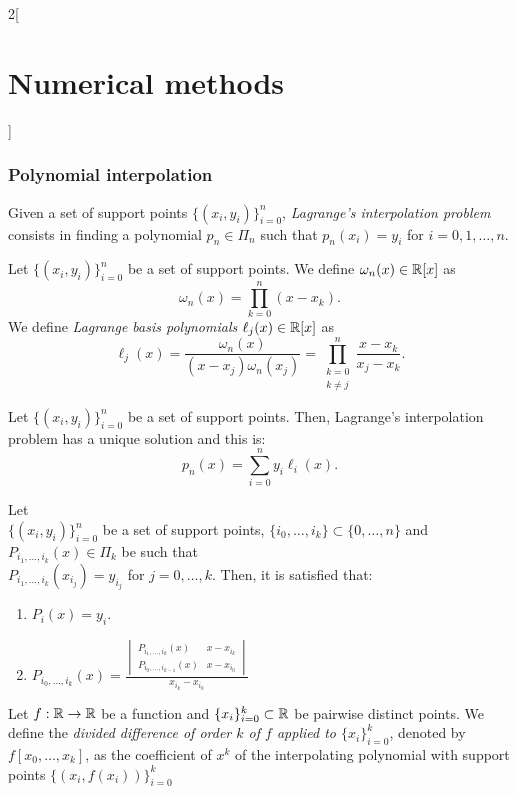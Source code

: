 \documentclass[../../../main.tex]{subfiles}
\begin{document}
\begin{multicols}{2}[\section{Numerical methods}]
\subsubsection*{Polynomial interpolation}
\begin{definition}
    Given a set of support points $\{(x_i,y_i)\}_{i=0}^n$, \textit{Lagrange's interpolation problem} consists in finding a polynomial $p_n\in\Pi_n$ such that $p_n(x_i)=y_i$ for $i=0,1,\ldots,n$.
\end{definition}
\begin{definition}
    Let $\{(x_i,y_i)\}_{i=0}^n$ be a set of support points. We define $\omega_n(x)\in\mathbb{R}[x]$ as $$\omega_n(x)=\prod_{k=0}^n(x-x_k).$$ We define \textit{Lagrange basis polynomials} $\ell_j(x)\in\mathbb{R}[x]$ as $$\ell_j(x)=\frac{\omega_n(x)}{(x-x_j)\omega_n(x_j)}=\prod_{\substack{k=0\\k\ne j}}^n\frac{x-x_k}{x_j-x_k}.$$
\end{definition}
\begin{prop}
    Let $\{(x_i,y_i)\}_{i=0}^n$ be a set of support points. Then, Lagrange's interpolation problem has a unique solution and this is: $$p_n(x)=\sum_{i=0}^ny_i\ell_i(x).$$
\end{prop}
\begin{prop}
    Let \\$\{(x_i,y_i)\}_{i=0}^n$ be a set of support points, $\{i_0,\ldots,i_k\}\subset\{0,\ldots,n\}$ and $P_{i_1,\ldots,i_k}(x)\in\Pi_k$ be such that\\ $P_{i_1,\ldots,i_k}(x_{i_j}) = y_{i_j}$ for $j=0,\ldots,k$. Then, it is satisfied that:
    \begin{enumerate}
        \item $P_i(x)=y_i$.
        \item $P_{i_0,\ldots,i_k}(x)=\frac{\begin{vmatrix}
        P_{i_1,\ldots,i_k}(x) & x-x_{i_k}\\
        P_{i_0,\ldots,i_{k-1}}(x) & x-x_{i_0}
        \end{vmatrix}}{x_{i_k}-x_{i_0}}$
    \end{enumerate}
\end{prop}
\begin{definition}
    Let $f:\mathbb{R}\rightarrow\mathbb{R}$ be a function and $\{x_i\}_{i=0}^k\subset\mathbb{R}$ be pairwise distinct points. We define the \textit{divided difference of order $k$ of $f$ applied to $\{x_i\}_{i=0}^k$}, denoted by $f[x_0,\ldots,x_k]$, as the coefficient of $x^k$ of the interpolating polynomial with support points $\{(x_i,f(x_i))\}_{i=0}^k$ 

\end{definition}
\end{multicols}
\end{document}
